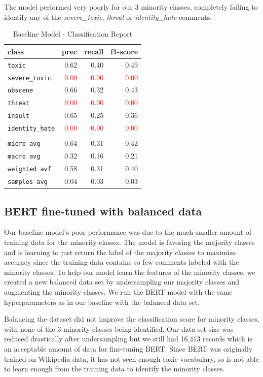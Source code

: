 \documentclass[11pt,a4paper]{article}
\begin{document}
The model performed very poorly for our 3 minority classes, completely failing to identify any of the \emph{severe\_toxic}, \emph{threat} or \emph{identity\_hate} comments.

\begin{table}
\centering
\begin{tabular}{lrrr}
\hline
\textbf{class} & \textbf{prec} & \textbf{recall} & \textbf{f1-score}\\
\hline
\verb|toxic| & 0.62 & 0.40 & 0.49 \\
\verb|severe_toxic| & \textcolor{red}{0.00} & \textcolor{red}{0.00} & \textcolor{red}{0.00} \\
\verb|obscene| & 0.66 & 0.32 & 0.43 \\
\verb|threat| & \textcolor{red}{0.00} & \textcolor{red}{0.00} & \textcolor{red}{0.00} \\
\verb|insult| & 0.65 & 0.25 & 0.36 \\
\verb|identity_hate| & \textcolor{red}{0.00} & \textcolor{red}{0.00} & \textcolor{red}{0.00} \\
\vspace{2\baselineskip}\\
\verb|micro avg| & 0.64 & 0.31 & 0.42 \\
\verb|macro avg| & 0.32 & 0.16 & 0.21 \\
\verb|weighted avf| & 0.58 & 0.31 & 0.40 \\
\verb|samples avg| & 0.04 & 0.03 & 0.03 \\
\hline
\end{tabular}
\caption{Baseline Model - Classification Report}
\end{table}

\subsection{BERT fine-tuned with balanced data}
Our baseline model's poor performance was due to the much smaller amount of training data for the minority classes. The model is favoring the majority classes and is learning to just return the label of the majority classes to maximize accuracy since the training data contains so few comments labeled with the minority classes. To help our model learn the features of the minority classes, we created a new balanced data set by undersampling our majority classes and augmenting the minority classes. We run the BERT model with the same hyperparameters as in our baseline with the balanced data set.

Balancing the dataset did not improve the classification score for minority classes, with none of the 3 minority classes being identified. Our data set size was reduced drastically after undersampling but we still had 16,413 records which is an acceptable amount of data for fine-tuning BERT.
Since BERT was originally trained on Wikipedia data, it has not seen enough toxic vocabulary, so is not able to learn enough from the training data to identify the minority classes. 
\end{document}
